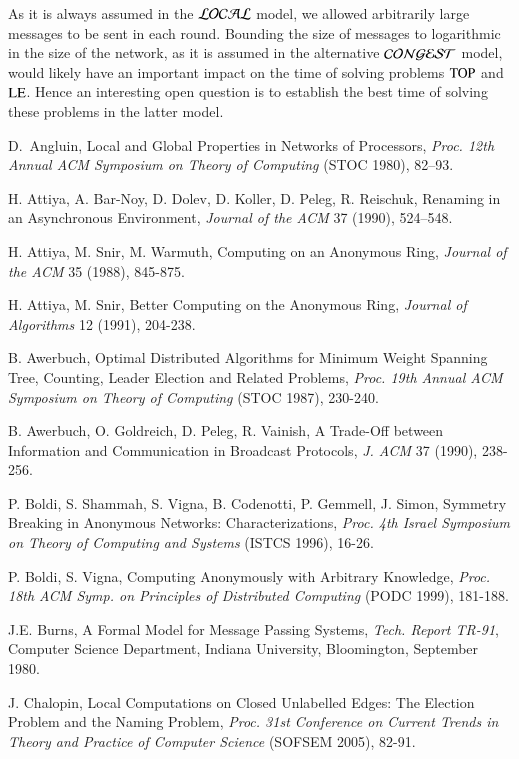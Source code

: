 \documentclass[a4paper,10pt]{article}
\newcommand{\problemLE}{\textup{LE}}
\newcommand{\problemTOP}{\textup{TOP}}
\begin{document}
As it is always assumed in the $\cal{LOCAL}$ model, we allowed arbitrarily large messages to be sent in each round. Bounding the size of messages to logarithmic in the size of the network, as
it is assumed in the alternative $\cal{CONGEST}$ model, would likely have an important impact on the time of solving problems $\problemTOP$ and $\problemLE$. Hence an interesting open question is
to establish the best time of solving these problems in the latter model.



\begin{thebibliography}{99}

D.~Angluin, Local and Global Properties in Networks of Processors,
{\em Proc. 12th Annual ACM Symposium on Theory of Computing} (STOC 1980), 82--93.

H. Attiya, A. Bar-Noy, D. Dolev, D. Koller, D. Peleg, R. Reischuk,
Renaming in an Asynchronous Environment, {\em Journal of the ACM} 37 (1990), 524--548.

H. Attiya, M. Snir, M. Warmuth,
Computing on an Anonymous Ring,
{\em Journal of the ACM} 35 (1988), 845-875.

H. Attiya, M. Snir,
Better Computing on the Anonymous Ring,
{\em Journal of Algorithms} 12 (1991), 204-238.

B. Awerbuch, Optimal Distributed Algorithms for Minimum Weight Spanning Tree, 
Counting, Leader Election and Related Problems,
{\em Proc. 19th Annual ACM Symposium on Theory of Computing} (STOC 1987), 230-240.

B. Awerbuch, O. Goldreich, D. Peleg, R. Vainish,
A Trade-Off between Information and Communication in Broadcast Protocols,
{\em J. {ACM}} 37 (1990), 238-256.

P. Boldi, S. Shammah, S. Vigna, B. Codenotti, P. Gemmell, J. Simon,
Symmetry Breaking in Anonymous Networks: Characterizations,
{\em Proc. 4th Israel Symposium on Theory of Computing and Systems} (ISTCS 1996), 16-26.

P. Boldi, S. Vigna,
Computing Anonymously with Arbitrary Knowledge,
{\em Proc. 18th ACM Symp. on Principles of Distributed Computing} (PODC 1999), 181-188.

J.E. Burns, A Formal Model for Message Passing Systems,
{\em Tech. Report TR-91}, Computer Science Department,
Indiana University, Bloomington, September 1980.

J. Chalopin,
Local Computations on Closed Unlabelled Edges: The Election Problem and the Naming Problem,
{\em Proc. 31st Conference on Current Trends in Theory and Practice of Computer Science} (SOFSEM 2005), 82-91.


\end{thebibliography}
\end{document}
